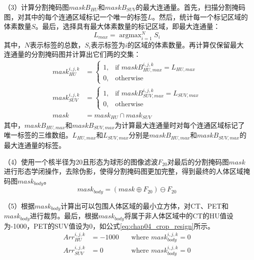 （3）计算分割掩码图\(maskB_{HU}\)和\(maskB_{SUV}\)的最大连通量。首先，扫描分割掩码图，对其中的每个连通区域标记一个唯一的标签\(L\)。然后，统计每一个标记区域的体素数量\(S\)。最后，选择具有最大体素数量的标记区域，即最大连通量：
\begin{equation}
    L_{max} = \mathop{\arg\max}_{i=1}^N S_i
\end{equation}
其中，\(N\)表示标签的总数，\(S_i\)表示标签为\(i\)的区域的体素数量。再计算仅保留最大连通量的分割掩码图并计算出它们两的交集：
\begin{equation}
    \begin{aligned}
        mask_{HU}^{i,j,k}  & =
        \begin{cases}
            1, & \text{if \(maskB_{HU, max}^{i,j,k} = L_{HU,max}\)} \\
            0, & \text{otherwise}
        \end{cases}  \\
        mask_{SUV}^{i,j,k} & =
        \begin{cases}
            1, & \text{if \(maskB_{SUV, max}^{i,j,k} = L_{SUV,max}\)} \\
            0, & \text{otherwise}
        \end{cases} \\
        mask               & = mask_{HU} \cap mask_{SUV}
    \end{aligned}
\end{equation}
其中，\(maskB_{HU, max}\)和\(maskB_{SUV, max}\)为计算最大连通量时对每个连通区域标记了唯一标签的三维数组。\(L_{HU,max}\)和\(L_{SUV,max}\)分别是\(maskB_{HU, max}\)和\(maskB_{SUV, max}\)的最大连通量的标签。

（4）使用一个核半径为20且形态为球形的图像滤波\(F_{20}\)对最后的分割掩码图\(mask\)进行形态学闭操作，去除伪影，使得分割掩码图更加完整，得到最终的人体区域掩码图\(mask_{body}\)。
\begin{equation}
    mask_{body} = (mask \oplus F_{20} ) \ominus F_{20}
\end{equation}

（5）根据\(mask_{body}\)计算出可以包围人体区域的最小立方体，对CT、PET和\(mask_{body}\)进行裁剪。最后，根据\(mask_{body}\)将属于非人体区域中的CT的HU值设为-1000，PET的SUV值设为0，如公式\ref{eq:chap04_crop_resign}所示。
\begin{equation}
    \begin{aligned}
        Arr_{HU}^{i, j, k}  & = -1000 \quad & \text{where \(mask_{body}^{i,j,k} = 0\)} \\
        Arr_{SUV}^{i, j, k} & = 0 \quad     & \text{where \(mask_{body}^{i,j,k} = 0\)}
    \end{aligned}
    \label{eq:chap04_crop_resign}
\end{equation}

